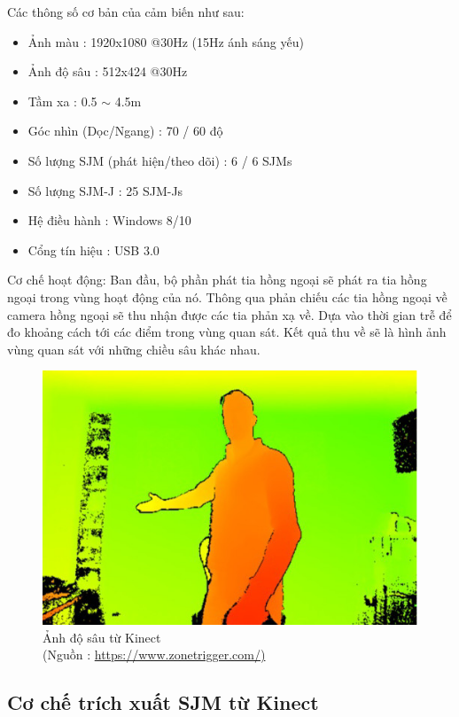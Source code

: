 Các thông số cơ bản của cảm biến như sau:
\begin{itemize}
\item Ảnh màu : 1920x1080 @30Hz (15Hz ánh sáng yếu)
\item Ảnh độ sâu : 512x424 @30Hz
\item Tầm xa : 0.5 $\sim$ 4.5m
\item Góc nhìn (Dọc/Ngang) : 70 / 60 độ
\item Số lượng SJM (phát hiện/theo dõi) : 6 / 6 SJMs
\item Số lượng SJM-J : 25 SJM-Js
\item Hệ điều hành : Windows 8/10
\item Cổng tín hiệu : USB 3.0
\end{itemize}

Cơ chế hoạt động: Ban đầu, bộ phần phát tia hồng ngoại sẽ phát ra tia hồng ngoại trong vùng hoạt động của nó. Thông qua phản chiếu các tia hồng ngoại về camera hồng ngoại sẽ thu nhận được các tia phản xạ về. Dựa vào thời gian trễ để đo khoảng cách tới các điểm trong vùng quan sát. Kết quả thu về sẽ là hình ảnh vùng quan sát với những chiều sâu khác nhau.

\FloatBarrier
\begin{figure}[htp]
\begin{center}
\includegraphics[scale=0.8]{chap3/c3_figs/depth.jpg}
\end{center}
\caption{Ảnh độ sâu từ Kinect \\(Nguồn : \url{https://www.zonetrigger.com/)}}
\label{fig:kinect}
\end{figure}
\FloatBarrier

\subsection{Cơ chế trích xuất SJM từ Kinect}


